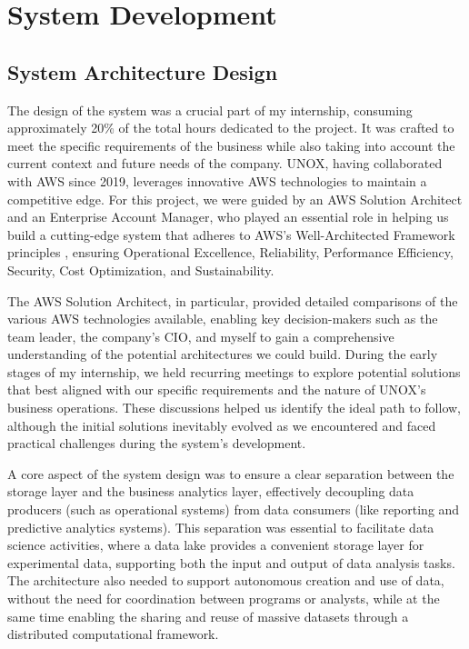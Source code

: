 \chapter{System Development}
\label{chp:project}

\section{System Architecture Design}
The design of the system was a crucial part of my internship, consuming approximately 20\% of the total hours dedicated to the project. It was crafted to meet the specific requirements of the business while also taking into account the current context and future needs of the company. UNOX, having collaborated with \ac{AWS} since 2019, leverages innovative \ac{AWS} technologies to maintain a competitive edge. For this project, we were guided by an \ac{AWS} Solution Architect and an Enterprise Account Manager, who played an essential role in helping us build a cutting-edge system that adheres to \ac{AWS}'s Well-Architected Framework principles \cite{awswell}, ensuring Operational Excellence, Reliability, Performance Efficiency, Security, Cost Optimization, and Sustainability.

The \ac{AWS} Solution Architect, in particular, provided detailed comparisons of the various \ac{AWS} technologies available, enabling key decision-makers such as the team leader, the company's \ac{CIO}, and myself to gain a comprehensive understanding of the potential architectures we could build. During the early stages of my internship, we held recurring meetings to explore potential solutions that best aligned with our specific requirements and the nature of UNOX's business operations. These discussions helped us identify the ideal path to follow, although the initial solutions inevitably evolved as we encountered and faced practical challenges during the system's development.

A core aspect of the system design was to ensure a clear separation between the storage layer and the business analytics layer, effectively decoupling data producers (such as operational systems) from data consumers (like reporting and predictive analytics systems). This separation was essential to facilitate data science activities, where a data lake provides a convenient storage layer for experimental data, supporting both the input and output of data analysis tasks. The architecture also needed to support autonomous creation and use of data, without the need for coordination between programs or analysts, while at the same time enabling the sharing and reuse of massive datasets through a distributed computational framework.

